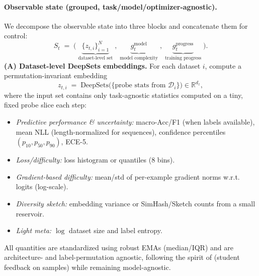 \documentclass[11pt]{article}
\newcommand{\R}{\mathbb{R}}
\newcommand{\1}{\mathbf{1}}
\begin{document}
\paragraph{Observable state (grouped, task/model/optimizer-agnostic).}
We decompose the observable state into three blocks and concatenate them for control:
\[
S_t \;=\; \Big(\;\underbrace{\{z_{t,i}\}_{i=1}^N}_{\text{dataset-level set}}\;,\;
\underbrace{g^{\text{model}}_t}_{\text{model complexity}}\;,\;
\underbrace{g^{\text{progress}}_t}_{\text{training progress}}\;\Big).
\]
\textbf{(A) Dataset-level DeepSets embeddings.} For each dataset $i$, compute a permutation-invariant embedding
\[
z_{t,i} \;=\; \mathrm{DeepSets}\!\Big(\{\text{probe stats from } \mathcal{D}_i\}\Big)\in\R^{d_z},
\]
where the input set contains only task-agnostic statistics computed on a tiny, fixed probe slice each step:
\begin{itemize}[leftmargin=1.25em]
  \item \emph{Predictive performance \& uncertainty:} macro-Acc/F1 (when labels available), mean NLL (length-normalized for sequences), confidence percentiles $(p_{10},p_{50},p_{90})$, ECE-5.
  \item \emph{Loss/difficulty:} loss histogram or quantiles (8 bins).
  \item \emph{Gradient-based difficulty:} mean/std of per-example gradient norms w.r.t. logits (log-scale).
  \item \emph{Diversity sketch:} embedding variance or SimHash/Sketch counts from a small reservoir.
  \item \emph{Light meta:} $\log$ dataset size and label entropy.
\end{itemize}
All quantities are standardized using robust EMAs (median/IQR) and are architecture- and label-permutation agnostic, following the spirit of \citet{fan2018l2t} (student feedback on samples) while remaining model-agnostic.
\end{document}
